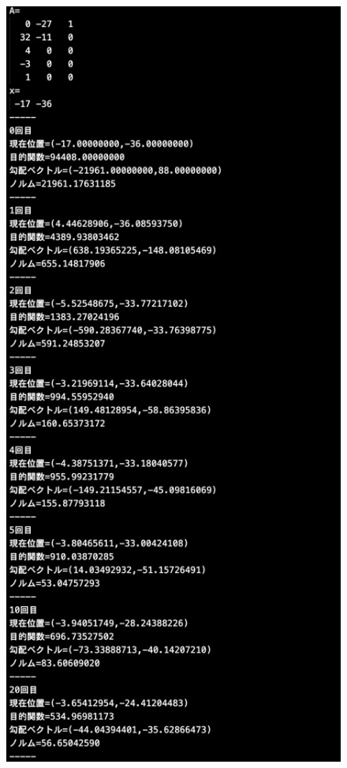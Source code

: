 \documentclass[12pt]{jarticle}
\begin{document}
\clearpage
\begin{figure}[h]
    \begin{center}
        \includegraphics[scale=0.2]{kadai1_2s_out1_1_1.png}
    \end{center}

\end{figure}
\end{document}

